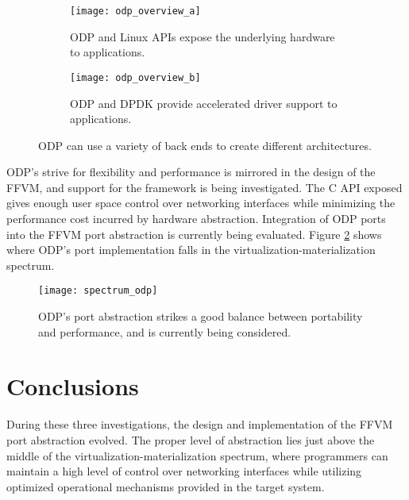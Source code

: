 \begin{figure}[h!]
  \centering
  \begin{subfigure}[b]{0.48\textwidth}
    \centering
    \texttt{[image: odp\_overview\_a]}
    \caption{ODP and Linux APIs expose the underlying hardware to applications.}
  \end{subfigure}
  \hfill
  \begin{subfigure}[b]{0.48\textwidth}
    \centering
    \texttt{[image: odp\_overview\_b]}
    \caption{ODP and DPDK provide accelerated driver support to applications.}
  \end{subfigure}
  \caption{ODP can use a variety of back ends to create different architectures.}
  \label{hardware:odp_overview}
\end{figure}

ODP's strive for flexibility and performance is mirrored in the design of the
FFVM, and support for the framework is being investigated. The C API exposed gives
enough user space control over networking interfaces while minimizing the
performance cost incurred by hardware abstraction. Integration of ODP ports
into the FFVM port abstraction is currently being evaluated. Figure
\ref{hardware:spectrum_odp} shows where ODP's port implementation falls in the
virtualization-materialization spectrum.

\begin{figure}[h!]
  \centering
  \texttt{[image: spectrum\_odp]}
  \caption{ODP's port abstraction strikes a good balance between portability
  and performance, and is currently being considered.}
  \label{hardware:spectrum_odp}
\end{figure}

\section{Conclusions}
\label{hardware:concl}
During these three investigations, the design and implementation of the FFVM
port abstraction evolved. The proper level of abstraction lies just above the
middle of the virtualization-materialization spectrum, where programmers can
maintain a high level of control over networking interfaces while utilizing
optimized operational mechanisms provided in the target system. 


